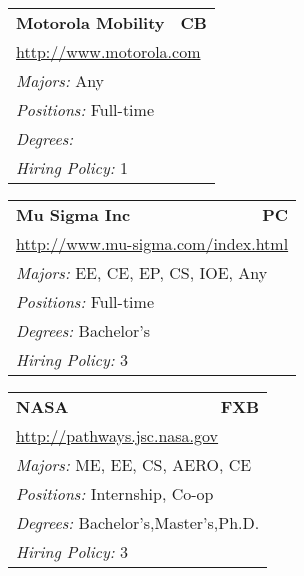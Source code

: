 \documentclass[twoside]{article}
\begin{document}
\begin{center}
\begin{multicols}{3}
\begin{FlushLeft}
\begin{minipage}{.9\columnwidth}
\end{minipage}
 
\begin{minipage}{.9\columnwidth}\begin{tabularx}{.95\columnwidth}{Xr}
                 {\Large\bf Motorola Mobility} & {\Large\bf CB}\\
    \multicolumn{2}{p{.95\columnwidth}}{\url{http://www.motorola.com}}\\
    \multicolumn{2}{p{.95\columnwidth}}{\emph{Majors:} Any}\\
    \multicolumn{2}{p{.95\columnwidth}}{\emph{Positions:} Full-time}\\
    \multicolumn{2}{p{.95\columnwidth}}{\emph{Degrees:} }\\
    \multicolumn{2}{p{.95\columnwidth}}{\emph{Hiring Policy:} 1}\\
    \end{tabularx}
    
\end{minipage}
 
\begin{minipage}{.9\columnwidth}\begin{tabularx}{.95\columnwidth}{Xr}
                 {\Large\bf Mu Sigma Inc} & {\Large\bf PC}\\
    \multicolumn{2}{p{.95\columnwidth}}{\url{http://www.mu-sigma.com/index.html}}\\
    \multicolumn{2}{p{.95\columnwidth}}{\emph{Majors:} EE, CE, EP, CS, IOE, Any}\\
    \multicolumn{2}{p{.95\columnwidth}}{\emph{Positions:} Full-time}\\
    \multicolumn{2}{p{.95\columnwidth}}{\emph{Degrees:} Bachelor's}\\
    \multicolumn{2}{p{.95\columnwidth}}{\emph{Hiring Policy:} 3}\\
    \end{tabularx}
    
\end{minipage}
 
\begin{minipage}{.9\columnwidth}\begin{tabularx}{.95\columnwidth}{Xr}
                 {\Large\bf NASA} & {\Large\bf FXB}\\
    \multicolumn{2}{p{.95\columnwidth}}{\url{http://pathways.jsc.nasa.gov}}\\
    \multicolumn{2}{p{.95\columnwidth}}{\emph{Majors:} ME, EE, CS, AERO, CE}\\
    \multicolumn{2}{p{.95\columnwidth}}{\emph{Positions:} Internship, Co-op}\\
    \multicolumn{2}{p{.95\columnwidth}}{\emph{Degrees:} Bachelor's,Master's,Ph.D.}\\
    \multicolumn{2}{p{.95\columnwidth}}{\emph{Hiring Policy:} 3}\\
    \end{tabularx}
    

\end{minipage}
\end{FlushLeft}
\end{multicols}
\end{center}
\end{document}
